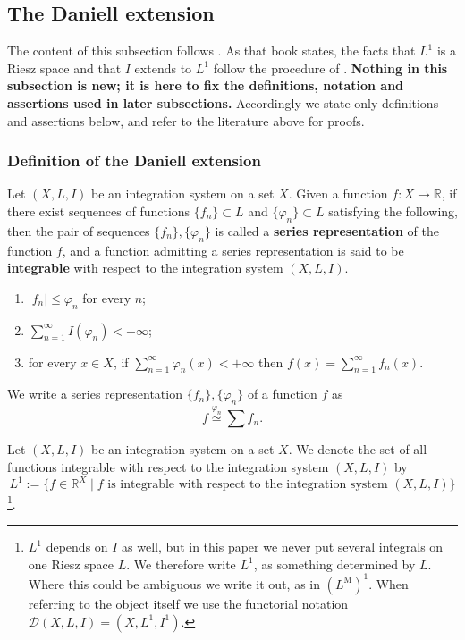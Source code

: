 \subsection{The Daniell extension}

The content of this subsection follows \cite{Yamagami}. As that book states, the
facts that $L^1$ is a Riesz space and that $I$ extends to $L^1$ follow the
procedure of \cite{BM}.
\textbf{Nothing in this subsection is new; it is here to fix the definitions,
notation and assertions used in later subsections.}
Accordingly we state only definitions and assertions below, and refer to the
literature above for proofs.

\subsubsection{Definition of the Daniell extension}

\begin{definition}\label{def:series-representation}
  Let $(X,L,I)$ be an integration system on a set $X$.
  Given a function $f:X\to\mathbb{R}$, if there exist sequences of functions
  $\{f_n\}\subset L$ and $\{\varphi_n\}\subset L$ satisfying the following, then
  the pair of sequences $\{f_n\},\{\varphi_n\}$ is called a \textbf{series
  representation} of the function $f$, and a function admitting a series
  representation is said to be \textbf{integrable} with respect to the
  integration system $(X,L,I)$.
  \begin{enumerate}
    \item $|f_n|\le\varphi_n$ for every $n$;
    \item $\sum_{n=1}^\infty I(\varphi_n)<+\infty$;
    \item for every $x\in X$, if $\sum_{n=1}^\infty \varphi_n(x)<+\infty$ then
      $f(x)=\sum_{n=1}^\infty f_n(x)$.
  \end{enumerate}
  We write a series representation $\{f_n\},\{\varphi_n\}$ of a function $f$ as
  \[
    f\overset{\varphi_n}{\simeq}\sum f_n .
  \]
\end{definition}

\begin{definition}
  Let $(X,L,I)$ be an integration system on a set $X$.
  We denote the set of all functions integrable with respect to the integration
  system $(X,L,I)$ by
  \[
    L^1:=\{f\in\mathbb{R}^X \mid\text{$f$ is integrable with respect to the integration system $(X,L,I)$}\}
  \]
  \footnote{
    $L^1$ depends on $I$ as well, but in this paper we never put several
    integrals on one Riesz space $L$.
    We therefore write $L^1$, as something determined by $L$.
    Where this could be ambiguous we write it out, as in $(L^{\mathrm{M}})^1$.
    When referring to the object itself we use the functorial notation
    $\mathcal{D}(X,L,I)=(X,L^1,I^1)$.
  }.
\end{definition}

